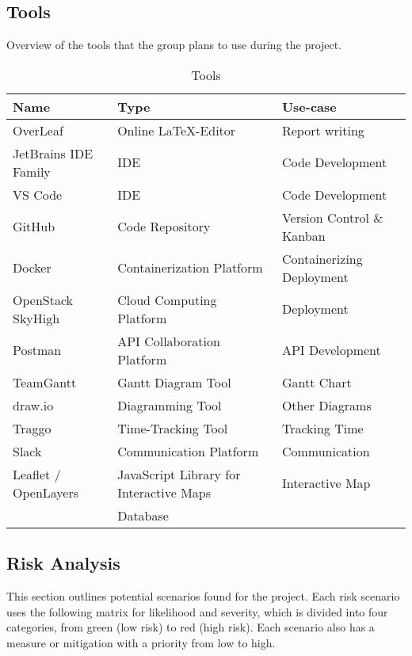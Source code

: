 \subsection{Tools}\label{sec:tools}
Overview of the tools that the group plans to use during the project.
\begin{table} [H]
    \centering
    \begin{tabular}{|l|l|l|}
    \hline
    Name & Type & Use-case \\
    \hline
    OverLeaf & Online \LaTeX-Editor & Report writing \\
    JetBrains IDE Family & IDE & Code Development \\
    VS Code & IDE & Code Development \\
    GitHub & Code Repository & Version Control \& Kanban \\
    Docker & Containerization Platform & Containerizing Deployment \\
    OpenStack SkyHigh & Cloud Computing Platform & Deployment \\
    Postman & API Collaboration Platform & API Development \\
    TeamGantt & Gantt Diagram Tool & Gantt Chart \\
    draw.io & Diagramming Tool & Other Diagrams \\
    Traggo & Time-Tracking Tool & Tracking Time \\
    Slack & Communication Platform & Communication \\
    Leaflet / OpenLayers & JavaScript Library for Interactive Maps & Interactive Map  \\
     & Database & \\
    \hline
    \end{tabular}
    \caption{Tools}
    \label{tab:tools}
\end{table}

\subsection{Risk Analysis}\label{sec:risk_analysis}

This section outlines potential scenarios found for the project. Each risk scenario uses the following matrix for likelihood and severity, which is divided into four categories, from green (low risk) to red (high risk). Each scenario also has a measure or mitigation with a priority from low to high. 

